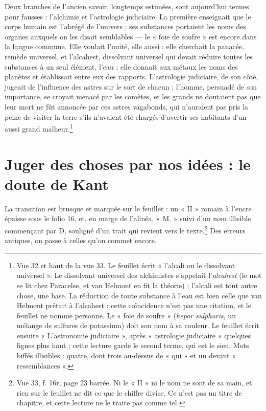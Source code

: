 \documentclass[11pt,a4paper]{article}
\begin{document}
Deux branches de l'ancien savoir, longtemps estimées, sont aujourd'hui tenues
pour fausses : l'alchimie et l'astrologie judiciaire. La première enseignait
que le corps humain est l'abrégé de l'univers ; ses substances portaient les
noms des organes auxquels on les disait semblables — le « foie de soufre » est
encore dans la langue commune. Elle voulait l'unité, elle aussi : elle
cherchait la panacée, remède universel, et l'alcahest, dissolvant universel qui
devait réduire toutes les substances à un seul élément, l'eau ; elle donnait
aux métaux les noms des planètes et établissait entre eux des rapports.
L'astrologie judiciaire, de son côté, jugeait de l'influence des astres sur le
sort de chacun ; l'homme, persuadé de son importance, se croyait menacé par les
comètes, et les grands ne doutaient pas que leur mort ne fût annoncée par ces
astres vagabonds, qui n'auraient pas pris la peine de visiter la terre s'ils
n'avaient été chargés d'avertir ses habitants d'un aussi grand
malheur.\footnote{Vue 32 et haut de la vue 33. Le feuillet écrit « l'alcali ou
le dissolvant universel ». Le dissolvant universel des alchimistes s'appelait
l'\emph{alcahest} (le mot se lit chez Paracelse, et van Helmont en fit la
théorie) ; l'alcali est tout autre chose, une base. La réduction de toute substance à l'eau est bien celle
que van Helmont prêtait à l'alcahest : cette coïncidence n'est pas une
citation, et le feuillet ne nomme personne. Le « foie de soufre »
(\emph{hepar sulphuris}, un mélange de sulfures de potassium) doit son nom à
sa couleur. Le feuillet écrit ensuite « L'astronomie judiciaire », après
« astrologie judiciaire » quelques lignes plus haut ; cette lecture garde le
second terme, qui est le sien. Mots biffés illisibles : quatre, dont trois au-dessus de
« qui » et un devant « ressemblances ».}

\section*{Juger des choses par nos idées : le doute de Kant}

La transition est brusque et marquée sur le feuillet : un « II » romain à
l'encre épaisse sous le folio 16, et, en marge de l'alinéa, « M. » suivi d'un
nom illisible commençant par D, souligné d'un trait qui revient vers le
texte.\footnote{Vue 33, f. 16r, page 23 barrée. Ni le « II » ni le nom ne sont
de sa main, et rien sur le feuillet ne dit ce que le chiffre divise. Ce n'est
pas un titre de chapitre, et cette lecture ne le traite pas comme tel.} Des
erreurs antiques, on passe à celles qu'on commet encore.
\end{document}
